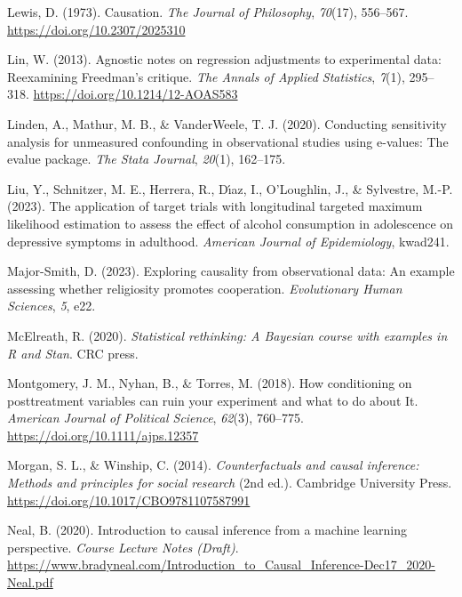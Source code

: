 \documentclass[
  single column]{article}
\newlength{\cslhangindent}
\newenvironment{CSLReferences}[2] %
 {\begin{list}{}{%
  \setlength{\itemindent}{0pt}
  \setlength{\leftmargin}{0pt}
  \setlength{\parsep}{0pt}
  \ifodd #1
   \setlength{\leftmargin}{\cslhangindent}
   \setlength{\itemindent}{-1\cslhangindent}
  \fi
  \setlength{\itemsep}{#2\baselineskip}}}
 {\end{list}}
\begin{document}
\begin{CSLReferences}{1}{0}
Lewis, D. (1973). Causation. \emph{The Journal of Philosophy},
\emph{70}(17), 556--567. \url{https://doi.org/10.2307/2025310}

Lin, W. (2013). {Agnostic notes on regression adjustments to
experimental data: Reexamining Freedman's critique}. \emph{The Annals of
Applied Statistics}, \emph{7}(1), 295--318.
\url{https://doi.org/10.1214/12-AOAS583}

Linden, A., Mathur, M. B., \& VanderWeele, T. J. (2020). Conducting
sensitivity analysis for unmeasured confounding in observational studies
using e-values: The evalue package. \emph{The Stata Journal},
\emph{20}(1), 162--175.

Liu, Y., Schnitzer, M. E., Herrera, R., Dı́az, I., O'Loughlin, J., \&
Sylvestre, M.-P. (2023). The application of target trials with
longitudinal targeted maximum likelihood estimation to assess the effect
of alcohol consumption in adolescence on depressive symptoms in
adulthood. \emph{American Journal of Epidemiology}, kwad241.

Major-Smith, D. (2023). Exploring causality from observational data: An
example assessing whether religiosity promotes cooperation.
\emph{Evolutionary Human Sciences}, \emph{5}, e22.

McElreath, R. (2020). \emph{Statistical rethinking: A {B}ayesian course
with examples in {R} and {S}tan}. CRC press.

Montgomery, J. M., Nyhan, B., \& Torres, M. (2018). How conditioning on
posttreatment variables can ruin your experiment and what to do about
It. \emph{American Journal of Political Science}, \emph{62}(3),
760--775. \url{https://doi.org/10.1111/ajps.12357}

Morgan, S. L., \& Winship, C. (2014). \emph{Counterfactuals and causal
inference: Methods and principles for social research} (2nd ed.).
Cambridge University Press.
\url{https://doi.org/10.1017/CBO9781107587991}

Neal, B. (2020). Introduction to causal inference from a machine
learning perspective. \emph{Course Lecture Notes (Draft)}.
\url{https://www.bradyneal.com/Introduction_to_Causal_Inference-Dec17_2020-Neal.pdf}


\end{CSLReferences}
\end{document}
